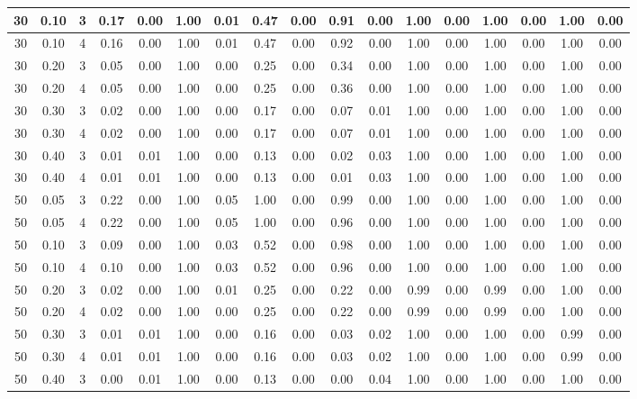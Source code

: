\documentclass[12pt]{article}
\begin{document}
\begin{table}[H]
{\begin{tabular}{|*{17}{c|}|}
30 & 0.10 & 3 & 0.17 & 0.00 & 1.00 & 0.01 & 0.47 & 0.00 & 0.91 & 0.00 & 1.00 & 0.00 & 1.00 & 0.00 & 1.00 & 0.00 \\ \hline
30 & 0.10 & 4 & 0.16 & 0.00 & 1.00 & 0.01 & 0.47 & 0.00 & 0.92 & 0.00 & 1.00 & 0.00 & 1.00 & 0.00 & 1.00 & 0.00 \\ \hline
30 & 0.20 & 3 & 0.05 & 0.00 & 1.00 & 0.00 & 0.25 & 0.00 & 0.34 & 0.00 & 1.00 & 0.00 & 1.00 & 0.00 & 1.00 & 0.00 \\ \hline
30 & 0.20 & 4 & 0.05 & 0.00 & 1.00 & 0.00 & 0.25 & 0.00 & 0.36 & 0.00 & 1.00 & 0.00 & 1.00 & 0.00 & 1.00 & 0.00 \\ \hline
30 & 0.30 & 3 & 0.02 & 0.00 & 1.00 & 0.00 & 0.17 & 0.00 & 0.07 & 0.01 & 1.00 & 0.00 & 1.00 & 0.00 & 1.00 & 0.00 \\ \hline
30 & 0.30 & 4 & 0.02 & 0.00 & 1.00 & 0.00 & 0.17 & 0.00 & 0.07 & 0.01 & 1.00 & 0.00 & 1.00 & 0.00 & 1.00 & 0.00 \\ \hline
30 & 0.40 & 3 & 0.01 & 0.01 & 1.00 & 0.00 & 0.13 & 0.00 & 0.02 & 0.03 & 1.00 & 0.00 & 1.00 & 0.00 & 1.00 & 0.00 \\ \hline
30 & 0.40 & 4 & 0.01 & 0.01 & 1.00 & 0.00 & 0.13 & 0.00 & 0.01 & 0.03 & 1.00 & 0.00 & 1.00 & 0.00 & 1.00 & 0.00 \\ \hline
50 & 0.05 & 3 & 0.22 & 0.00 & 1.00 & 0.05 & 1.00 & 0.00 & 0.99 & 0.00 & 1.00 & 0.00 & 1.00 & 0.00 & 1.00 & 0.00 \\ \hline
50 & 0.05 & 4 & 0.22 & 0.00 & 1.00 & 0.05 & 1.00 & 0.00 & 0.96 & 0.00 & 1.00 & 0.00 & 1.00 & 0.00 & 1.00 & 0.00 \\ \hline
50 & 0.10 & 3 & 0.09 & 0.00 & 1.00 & 0.03 & 0.52 & 0.00 & 0.98 & 0.00 & 1.00 & 0.00 & 1.00 & 0.00 & 1.00 & 0.00 \\ \hline
50 & 0.10 & 4 & 0.10 & 0.00 & 1.00 & 0.03 & 0.52 & 0.00 & 0.96 & 0.00 & 1.00 & 0.00 & 1.00 & 0.00 & 1.00 & 0.00 \\ \hline
50 & 0.20 & 3 & 0.02 & 0.00 & 1.00 & 0.01 & 0.25 & 0.00 & 0.22 & 0.00 & 0.99 & 0.00 & 0.99 & 0.00 & 1.00 & 0.00 \\ \hline
50 & 0.20 & 4 & 0.02 & 0.00 & 1.00 & 0.00 & 0.25 & 0.00 & 0.22 & 0.00 & 0.99 & 0.00 & 0.99 & 0.00 & 1.00 & 0.00 \\ \hline
50 & 0.30 & 3 & 0.01 & 0.01 & 1.00 & 0.00 & 0.16 & 0.00 & 0.03 & 0.02 & 1.00 & 0.00 & 1.00 & 0.00 & 0.99 & 0.00 \\ \hline
50 & 0.30 & 4 & 0.01 & 0.01 & 1.00 & 0.00 & 0.16 & 0.00 & 0.03 & 0.02 & 1.00 & 0.00 & 1.00 & 0.00 & 0.99 & 0.00 \\ \hline
50 & 0.40 & 3 & 0.00 & 0.01 & 1.00 & 0.00 & 0.13 & 0.00 & 0.00 & 0.04 & 1.00 & 0.00 & 1.00 & 0.00 & 1.00 & 0.00 \\ \hline

\end{tabular}}
\end{table}
\end{document}

